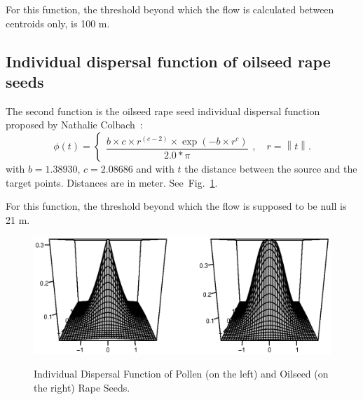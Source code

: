 % 

For this function,
the  threshold beyond which the
flow is calculated between centroids
only, is 100 m.


\medskip

\subsection{Individual dispersal function  of oilseed rape seeds}

The second function is the oilseed rape
seed individual dispersal function
proposed by Nathalie Colbach~\cite{Colbach2:2001}:
\begin{equation}
  \label{eq:dispersion:colbach}
  \phi\left(t\right)
  =
  \left\{
    \begin{array}{lll}
\dfrac{b \times c \times r^(c-2) \times \exp{ (-b \times r^c)}} {2.0*\pi}
    \end{array}
  \right.,\quad r=\left\|t\right\|.
\end{equation}
with $b = 1.38930$, $c= 2.08686$ and with
$t$ the  distance between the source  and the target points.
Distances are in meter.
See~Fig.~\ref{fig:phi:colbach}.

For this function,
the  threshold beyond which the
flow is supposed to be null is 21 m.

\begin{figure}[htbp]
  \begin{center}
\includegraphics[width=15cm]{./VignetteDir/graphics/dispersion.eps}
    \caption{Individual Dispersal Function of Pollen (on  the left) and
      Oilseed (on the right) Rape Seeds.}
     \label{fig:phi:klein}
    \label{fig:phi:colbach}
  \end{center}
\end{figure}

